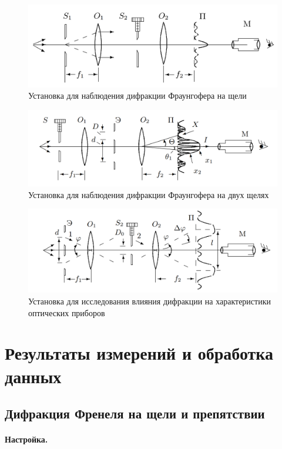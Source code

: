 \documentclass[a4paper, 12pt]{article}
\begin{document}
\begin{figure}[h!]
	\centering
	\includegraphics[width=0.8\linewidth]{3.png}
	\caption{Установка для наблюдения дифракции Фраунгофера на щели}
	\label{fig:Фраунгофер}
\end{figure}

\begin{figure}[h!]
	\centering
	\includegraphics[width=0.8\linewidth]{4.png}
	\caption{Установка для наблюдения дифракции Фраунгофера на двух щелях}
	\label{fig:Фраунгофер2}
\end{figure}

\begin{figure}[h!]
	\centering
	\includegraphics[width=0.8\linewidth]{9.png}
	\caption{Установка для исследования влияния дифракции на характеристики оптических приборов}
	\label{fig:послустановка}
\end{figure}


\section{Результаты измерений и обработка данных}

\subsection{Дифракция Френеля на щели и препятствии}

\paragraph{Настройка.}
\end{document}
